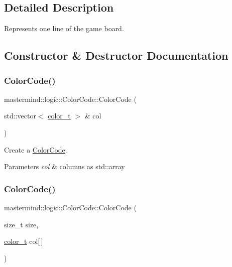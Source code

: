 \subsection{Detailed Description}
Represents one line of the game board. 

\subsection{Constructor \& Destructor Documentation}
\hypertarget{classmastermind_1_1logic_1_1_color_code_a9bc91c2e878553c2e7a5b0821b76c525}{}\label{classmastermind_1_1logic_1_1_color_code_a9bc91c2e878553c2e7a5b0821b76c525} 
\subsubsection{\texorpdfstring{Color\+Code()}{ColorCode()}\hspace{0.1cm}{\footnotesize\ttfamily [1/3]}}
{\footnotesize\ttfamily mastermind\+::logic\+::\+Color\+Code\+::\+Color\+Code (\begin{DoxyParamCaption}\item[{std\+::vector$<$ \hyperlink{namespacemastermind_1_1logic_aab4e2166db8e8e5dcbed785c7927eca1}{color\+\_\+t} $>$ \&}]{col }\end{DoxyParamCaption})}



Create a \hyperlink{classmastermind_1_1logic_1_1_color_code}{Color\+Code}. 


\begin{DoxyParams}{Parameters}
{\em col} & columns as std\+::array \\
\hline
\end{DoxyParams}
\hypertarget{classmastermind_1_1logic_1_1_color_code_ab4f174ea13758a5328f23daf26d8d61f}{}\label{classmastermind_1_1logic_1_1_color_code_ab4f174ea13758a5328f23daf26d8d61f} 
\subsubsection{\texorpdfstring{Color\+Code()}{ColorCode()}\hspace{0.1cm}{\footnotesize\ttfamily [2/3]}}
{\footnotesize\ttfamily mastermind\+::logic\+::\+Color\+Code\+::\+Color\+Code (\begin{DoxyParamCaption}\item[{size\+\_\+t}]{size,  }\item[{\hyperlink{namespacemastermind_1_1logic_aab4e2166db8e8e5dcbed785c7927eca1}{color\+\_\+t}}]{col\mbox{[}$\,$\mbox{]} }\end{DoxyParamCaption})}




